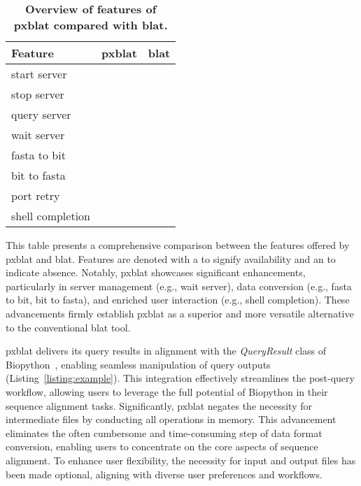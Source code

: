 \documentclass[10pt,letterpaper]{article}
\newcommand{\cmark}{\ding{51}}%
\newcommand{\xmark}{\ding{55}}%
\begin{document}
\begin{table}[!ht]
	\centering
	\caption{{\bf Overview of features of \gls{pxblat} compared with \gls{blat}.}}\label{tab:apicmp}
	\begin{tabular}{@{}lll@{}}
		\toprule
		Feature          & \gls{pxblat} & \gls{blat} \\ \midrule
		start server     & \cmark{}     & \cmark{}   \\
		stop  server     & \cmark{}     & \cmark{}   \\
		query server     & \cmark{}     & \cmark{}   \\
		wait server      & \cmark{}     & \xmark{}   \\
		fasta to bit     & \cmark{}     & \xmark{}   \\
		bit to fasta     & \cmark{}     & \xmark{}   \\
		port retry       & \cmark{}     & \xmark{}   \\
		shell completion & \cmark{}     & \xmark{}   \\
		\bottomrule
	\end{tabular}
	\begin{flushleft}
		This table presents a comprehensive comparison between the features offered by \gls{pxblat} and \gls{blat}.
		Features are denoted with a \cmark{} to signify availability and an \xmark{} to indicate absence.
		Notably, \gls{pxblat} showcases significant enhancements, particularly in server management (e.g., wait server), data conversion (e.g., fasta to bit, bit to fasta), and enriched user interaction (e.g., shell completion).
		These advancements firmly establish \gls{pxblat} as a superior and more versatile alternative to the conventional \gls{blat} tool.
	\end{flushleft}
\end{table}

\gls{pxblat} delivers its query results in alignment with the \emph{QueryResult} class of Biopython~\cite{cock2009biopython}, enabling seamless manipulation of query outputs (Listing~\ref{listing:example}).
This integration effectively streamlines the post-query workflow, allowing users to leverage the full potential of Biopython in their sequence alignment tasks.
Significantly, \gls{pxblat} negates the necessity for intermediate files by conducting all operations in memory.
This advancement eliminates the often cumbersome and time-consuming step of data format conversion, enabling users to concentrate on the core aspects of sequence alignment.
To enhance user flexibility, the necessity for input and output files has been made optional, aligning with diverse user preferences and workflows.
\end{document}
